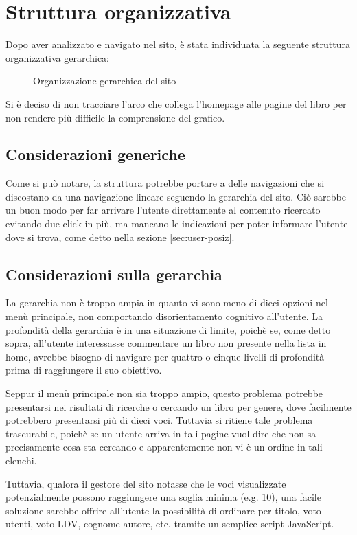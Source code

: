 \section{Struttura organizzativa}\label{sec:struttura-org}
Dopo aver analizzato e navigato nel sito, è stata individuata la seguente
struttura organizzativa gerarchica:
\begin{figure}[h!]
    \centering
    \scalebox{.7}{}
    \caption{Organizzazione gerarchica del sito}
    \label{fig:gerarchia}
\end{figure}

Si è deciso di non tracciare l'arco che collega l'homepage alle pagine del
libro per non rendere più difficile la comprensione del grafico.

\subsection{Considerazioni generiche}
Come si può notare, la struttura potrebbe portare a delle navigazioni che si
discostano da una navigazione lineare seguendo la gerarchia del sito.
Ciò sarebbe un buon modo per far arrivare l'utente direttamente al contenuto
ricercato evitando due click in più, ma mancano le indicazioni per poter informare l'utente dove si trova, come detto nella sezione
\ref{sec:user-posiz}.

\subsection{Considerazioni sulla gerarchia}
La gerarchia non è troppo ampia in quanto vi sono meno di dieci opzioni nel
menù principale, non comportando disorientamento cognitivo all'utente.
La profondità della gerarchia è in una situazione di limite,
poichè se, come detto sopra, all'utente interessasse commentare un libro non
presente nella lista in home, avrebbe bisogno di navigare per quattro o cinque
livelli di profondità prima di raggiungere il suo obiettivo.

Seppur il menù principale non sia troppo ampio, questo problema potrebbe
presentarsi nei risultati di ricerche o cercando un libro per genere, dove
facilmente potrebbero presentarsi più di dieci voci.
Tuttavia si ritiene tale problema trascurabile, poichè se un utente arriva in
tali pagine vuol dire che non sa precisamente cosa sta cercando e
apparentemente non vi è un ordine in tali elenchi.

Tuttavia, qualora il gestore del sito notasse che le voci visualizzate
potenzialmente possono raggiungere una soglia minima (e.g. 10), una facile
soluzione sarebbe offrire all'utente la possibilità di ordinare per titolo,
voto utenti, voto LDV, cognome autore, etc. tramite un semplice script
JavaScript.

